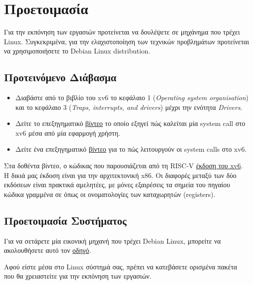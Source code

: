 \documentclass[18pt]{extarticle}
\begin{document}
\section{Προετοιμασία}

Για την εκπόνηση των εργασιών προτείνεται να δουλέψετε σε μηχάνημα που τρέχει Linux. Συγκεκριμένα,
για την ελαχιστοποίηση των τεχνικών προβλημάτων προτείνεται να χρησιμοποιήσετε το Debian Linux distribution.

\subsection{Προτεινόμενο Διάβασμα}

\begin{itemize}

    \item Διαβάστε από το βιβλίο του xv6 \cite{xv6Book} το κεφάλαιο 1 (\textit{Operating
          system organisation}) και το κεφάλαιο 3 (\textit{Traps, interrupts, and
          drivers}) μέχρι την ενότητα \textit{Drivers}.
    \item Δείτε το επεξηγηματικό \href{https://www.youtube.com/watch?v=RdxHGyeoyqI}{βίντεο} το οποίο εξηγεί πώς καλείται μία system call στο xv6 μέσα από μία εφαρμογή χρήστη.
    \item Δείτε ένα επεξηγηματικό \href{https://www.youtube.com/watch?v=w7Q66ItKrn8}{βίντεο} για το πώς λειτουργούν οι system calls στο xv6.

\end{itemize}

\begin{info}[Σημείωση]
    Στα δοθέντα βίντεο, ο κώδικας που παρουσιάζεται από τη RISC-V \href{https://github.com/mit-pdos/xv6-riscv}{έκδοση του xv6}.
    Η δικιά μας έκδοση είναι για την αρχιτεκτονική x86. Οι διαφορές μεταξύ των δύο εκδόσεων είναι πρακτικά αμελητέες,
    με μόνες εξαιρέσεις τα σημεία του πηγαίου κώδικα γραμμένα σε  όπως οι ονοματολογίες των καταχωρητών (registers).
\end{info}

\subsection{Προετοιμασία Συστήματος}

Για να σετάρετε μία εικονική μηχανή που τρέχει Debian Linux, μπορείτε να ακολουθήσετε αυτό τον \href{}{οδηγό}. %

Αφού είστε μέσα στο Linux σύστημά σας, πρέπει να κατεβάσετε ορισμένα πακέτα που θα χρειαστείτε για την εκπόνηση των εργασιών.
\end{document}
